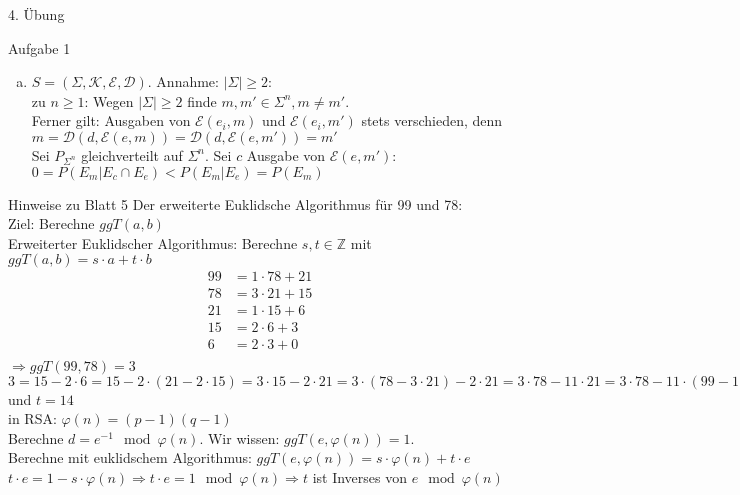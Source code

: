 \begin{section}{4. Übung}
\begin{subsection}{Aufgabe 1}
\begin{enumerate}[a)]
\begin{enumerate}[(i)]
   $\Rightarrow S$ ist perfekt sicher. \\
  \end{enumerate}
  \item $S = (\Sigma, \mathcal{K}, \mathcal{E}, \mathcal{D})$. Annahme: $|\Sigma| \geq 2$:\\
  zu $n \geq 1$: Wegen $|\Sigma| \geq 2$ finde $m,m' \in \Sigma^n, m \neq m'$.\\
  Ferner gilt: Ausgaben von $\mathcal{E}(e_i,m)$ und $\mathcal{E}(e_i,m')$ stets verschieden, denn \\
  $m = \mathcal{D}(d,\mathcal{E}(e,m)) = \mathcal{D}(d,\mathcal{E}(e,m')) = m'$\\
  Sei $P_{\Sigma^n}$ gleichverteilt auf $\Sigma^n$. Sei $c$ Ausgabe von $\mathcal{E}(e,m')$:\\
  $0 = P(E_m|E_c \cap E_e) < P(E_m|E_e) = P(E_m)$
  \end{enumerate}
 \end{subsection}
 \begin{subsection}{Hinweise zu Blatt 5}
  Der erweiterte Euklidsche Algorithmus für 99 und 78:\\
  Ziel: Berechne $ggT(a,b)$ \\
  Erweiterter Euklidscher Algorithmus: Berechne $s,t \in \mathbb{Z}$ mit $ggT(a,b) = s\cdot a + t\cdot b$
  \begin{align*}
   99 &= 1 \cdot 78 + 21 \\
   78 &= 3 \cdot 21 + 15 \\
   21 &= 1 \cdot 15 + 6 \\
   15 &= 2 \cdot 6 + 3 \\
   6 &= 2 \cdot 3 + 0 \\
  \end{align*}
  $\Rightarrow ggT(99,78) = 3$\\
  $3 = 15-2\cdot 6= 15-2\cdot (21-2\cdot 15) = 3\cdot 15 - 2 \cdot 21 = 3 \cdot (78-3\cdot 21) -2\cdot 21 = 3\cdot 78 - 11 \cdot 21 = 3\cdot78 -11\cdot(99-1\cdot78) = 14\cdot78 - 11\cdot99 \Rightarrow s = -11$ und $t = 14$ \\
  in RSA: $\varphi(n) = (p-1)(q-1)$\\
  Berechne $d = e^{-1} \mod \varphi(n)$. Wir wissen: $ggT(e,\varphi(n))=1$.\\
  Berechne mit euklidschem Algorithmus: $ggT(e,\varphi(n))=s\cdot\varphi(n) +t\cdot e$\\
  $t\cdot e = 1 - s \cdot \varphi(n) \Rightarrow t\cdot e = 1 \mod \varphi(n) \Rightarrow t$ ist Inverses von $e \mod \varphi(n)$
  

 \end{subsection}


\end{section}
